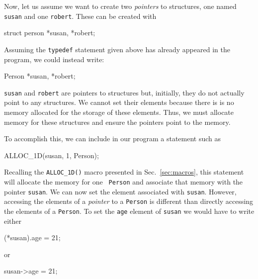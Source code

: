 Now, let us assume we want to create two {\em pointers} to structures,
one named {\tt susan} and one {\tt robert}.  These can be created with
\begin{code}
  struct person *susan, *robert;
\end{code}
Assuming the {\tt typedef} statement given above has already appeared
in the program, we could instead write:
\begin{code}
  Person *susan, *robert;
\end{code}
{\tt susan} and {\tt robert} are pointers to structures but,
initially, they do not actually point to any structures.  We cannot
set their elements because there is is no memory allocated for the
storage of these elements.  Thus, we must allocate memory for these
structures and ensure the pointers point to the memory.

To accomplish this, we can include in our program a statement such as
\begin{code}
  ALLOC_1D(susan, 1, Person);
\end{code}
Recalling the {\tt ALLOC\_1D()} macro presented in Sec.\
\ref{sec:macros}, this statement will allocate the memory for one {\tt
  Person} and associate that memory with the pointer {\tt susan}.  We
can now set the element associated with {\tt susan}.  However,
accessing the elements of a {\em pointer} to a {\tt Person} is different
than directly accessing the elements of a {\tt Person}.  To set the
{\tt age} element of {\tt susan} we would have to write either
\begin{code}
  (*susan).age = 21;
\end{code}
or
\begin{code}
  susan->age = 21;
\end{code}

